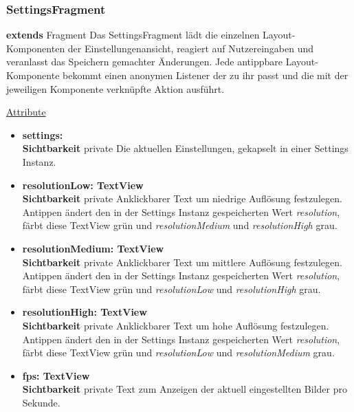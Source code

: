 \subsubsection{SettingsFragment} \label{app:klasse:SettingsFragment}
\textbf{extends} Fragment \newline
Das SettingsFragment lädt die einzelnen Layout-Komponenten der Einstellungenansicht, reagiert auf Nutzereingaben und veranlasst das Speichern gemachter Änderungen. Jede antippbare Layout-Komponente bekommt einen anonymen Listener der zu ihr passt und die mit der jeweiligen Komponente verknüpfte Aktion ausführt.
\newline

\underline{Attribute}
\begin{itemize}
\itemsep0pt
\item \textbf{settings:  } \hfill\\ 
\textbf{Sichtbarkeit} private \newline
Die aktuellen Einstellungen, gekapselt in einer Settings Instanz.

\item \textbf{resolutionLow: TextView} \hfill\\ 
\textbf{Sichtbarkeit} private \newline
Anklickbarer Text um niedrige Auflösung festzulegen. Antippen ändert den in der Settings Instanz gespeicherten Wert \textit{resolution}, färbt diese TextView grün und \textit{resolutionMedium} und \textit{resolutionHigh} grau.

\item \textbf{resolutionMedium: TextView} \hfill\\ 
\textbf{Sichtbarkeit} private \newline
Anklickbarer Text um mittlere Auflösung festzulegen. Antippen ändert den in der Settings Instanz gespeicherten Wert \textit{resolution}, färbt diese TextView grün und \textit{resolutionLow} und \textit{resolutionHigh} grau.

\item \textbf{resolutionHigh: TextView} \hfill\\ 
\textbf{Sichtbarkeit} private \newline
Anklickbarer Text um hohe Auflösung festzulegen. Antippen ändert den in der Settings Instanz gespeicherten Wert \textit{resolution}, färbt diese TextView grün und \textit{resolutionLow} und \textit{resolutionMedium} grau.

\item \textbf{fps: TextView} \hfill\\ 
\textbf{Sichtbarkeit} private \newline
Text zum Anzeigen der aktuell eingestellten Bilder pro Sekunde.


\end{itemize}

